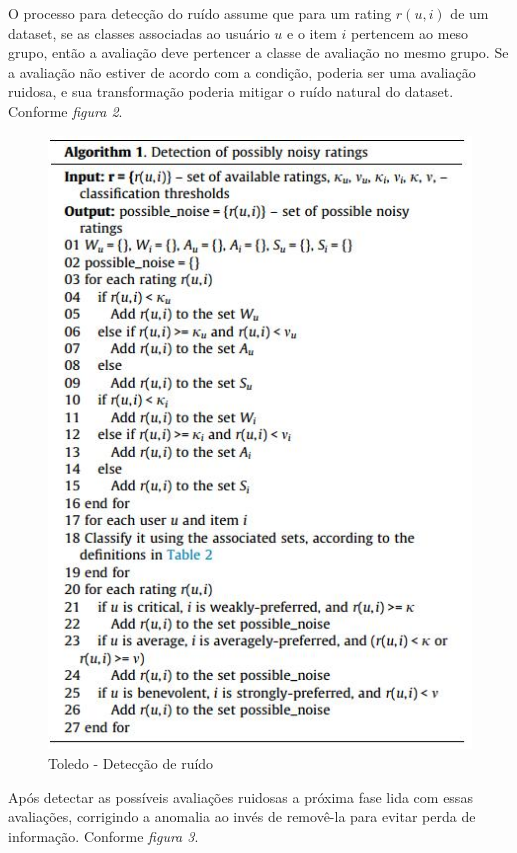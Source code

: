 \documentclass{sig-alternate}
\begin{document}
O processo para detecção do ruído assume que para um rating $r(u,i)$ de um dataset, se as classes associadas ao usuário $u$ e o item $i$ pertencem ao meso grupo, então a avaliação deve pertencer a classe de avaliação no mesmo grupo. Se a avaliação não estiver de acordo com a condição, poderia ser uma avaliação ruidosa, e sua transformação poderia mitigar o ruído natural do dataset. Conforme \emph{figura 2}. 

\begin{figure}[h]
\centering
\includegraphics[width=1.0\linewidth]{detec_ruido_toledo}
\caption{Toledo - Detecção de ruído}
\label{Figura 2}
\end{figure}

Após detectar as possíveis avaliações ruidosas a próxima fase lida com essas avaliações, corrigindo a anomalia ao invés de removê-la para evitar perda de informação. Conforme \emph{figura 3}.
\end{document}
